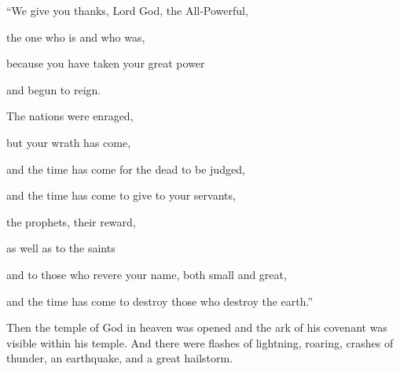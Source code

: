 {\par }{\Q “We give
you
thanks,
Lord
God,
the All-Powerful,
\par }{\Q the one who is
and
who was,
\par }{\Q because
you have taken
your
great
power
\par }{\Q and
begun to reign.
\par }{\Q {}The nations
were enraged,
\par }{\Q but
your
wrath
has come,
\par }{\Q and
the
time
has come for the
dead
to be judged,
\par }{\Q and
the time has come to give
to your
servants,
\par }{\Q the
prophets,
their reward,
\par }{\Q as well as to the saints
\par }{\Q and
to those who revere
your
name,
both small
and
great,
\par }{\Q and
the time has come to destroy
those who destroy
the earth.”
\par }{\PP {}Then
the temple
of God
in
heaven
was opened
and
the ark
of his
covenant
was visible
within
his
temple.
And
there were
flashes of lightning,
roaring,
crashes of thunder,
an earthquake,
and
a great
hailstorm.

}
